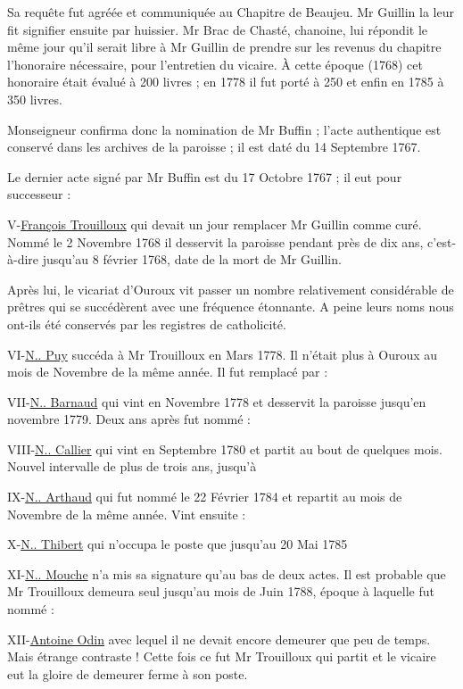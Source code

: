 Sa requête fut agréée et communiquée au Chapitre de Beaujeu. Mr Guillin la leur fit signifier ensuite par huissier. Mr Brac de Chasté, chanoine, lui répondit le même jour qu'il serait libre à Mr Guillin de prendre sur les revenus du chapitre l'honoraire nécessaire, pour l'entretien du vicaire. À cette époque (1768) cet honoraire était évalué à 200 livres ; en 1778 il fut porté à 250 et enfin en 1785 à 350 livres.

Monseigneur confirma donc la nomination de Mr Buffin ; l'acte authentique est conservé dans les archives de la paroisse ; il est daté du 14 Septembre 1767.

Le dernier acte signé par Mr Buffin est du 17 Octobre 1767 ; il eut pour successeur :

V-\underline{François Trouilloux} qui devait un jour remplacer Mr Guillin comme curé. Nommé le 2 Novembre 1768 il desservit la paroisse pendant près de dix ans, c'est-à-dire jusqu'au 8 février 1768, date de la mort de Mr Guillin.

Après lui, le vicariat d'Ouroux vit passer un nombre relativement considérable de prêtres qui se succédèrent avec une fréquence étonnante. A peine leurs noms nous ont-ils été conservés par les registres de catholicité.

VI-\underline{N.. Puy} succéda à Mr Trouilloux en Mars 1778. Il n'était plus à Ouroux au mois de Novembre de la même année. Il fut remplacé par :

VII-\underline{N.. Barnaud} qui vint en Novembre 1778 et desservit la paroisse jusqu'en novembre 1779. Deux ans après fut nommé :

VIII-\underline{N.. Callier} qui vint en Septembre 1780 et partit au bout de quelques mois. Nouvel intervalle de plus de trois ans, jusqu'à

IX-\underline{N.. Arthaud} qui fut nommé le 22 Février 1784 et repartit au mois de Novembre de la même année. Vint ensuite :

X-\underline{N.. Thibert} qui n'occupa le poste que jusqu'au 20 Mai 1785

XI-\underline{N.. Mouche} n'a mis sa signature qu'au bas de deux actes. Il est probable que Mr Trouilloux demeura seul jusqu'au mois de Juin 1788, époque à laquelle fut nommé :

XII-\underline{Antoine Odin} avec lequel il ne devait encore demeurer que peu de temps. Mais étrange contraste ! Cette fois ce fut Mr Trouilloux qui partit et le vicaire eut la gloire de demeurer ferme à son poste.

